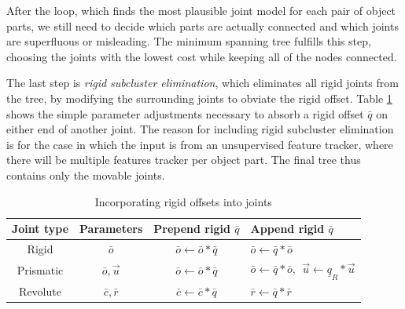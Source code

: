\documentclass[letterpaper, 10 pt, conference]{ieeeconf}  %
\begin{document}
After the loop, which finds the most plausible joint model for each pair of object parts, we still need to decide which parts are actually connected and which joints are superfluous or misleading. The minimum spanning tree fulfills this step, choosing the joints with the lowest cost while keeping all of the nodes connected.

The last step is \emph{rigid subcluster elimination}, which eliminates all rigid joints from the tree, by modifying the surrounding joints to obviate the rigid offset. Table \ref{tbl:move} shows the simple parameter adjustments necessary to absorb a rigid offset $\bar{q}$ on either end of another joint. The reason for including rigid subcluster elimination is for the case in which the input is from an unsupervised feature tracker, where there will be multiple features tracker per object part. The final tree thus contains only the movable joints.

\begin{table}[ht]
  \begin{tabular}{c|c|c|l}
    Joint type & Parameters & Prepend rigid $\bar{q}$ & Append rigid $\bar{q}$ \\
    \hline
    Rigid & $\bar{o}$ & $\bar{o} \leftarrow \bar{o}*\bar{q}$ & $\bar{o} \leftarrow \bar{q}*\bar{o}$ \\
    Prismatic & $\bar{o}, \vec{u}$ & $\bar{o} \leftarrow \bar{o}*\bar{q}$ & $\bar{o} \leftarrow \bar{q}*\bar{o},~ ~ \vec{u} \leftarrow \underline{q}_R*\vec{u}$ \\
    Revolute & $\bar{c}, \bar{r}$ & $\bar{c} \leftarrow \bar{c}*\bar{q}$ & $\bar{r} \leftarrow \bar{q}*\bar{r}$ \\
  \end{tabular}
  \caption{Incorporating rigid offsets into joints}
  \label{tbl:move}
\end{table}
\end{document}
